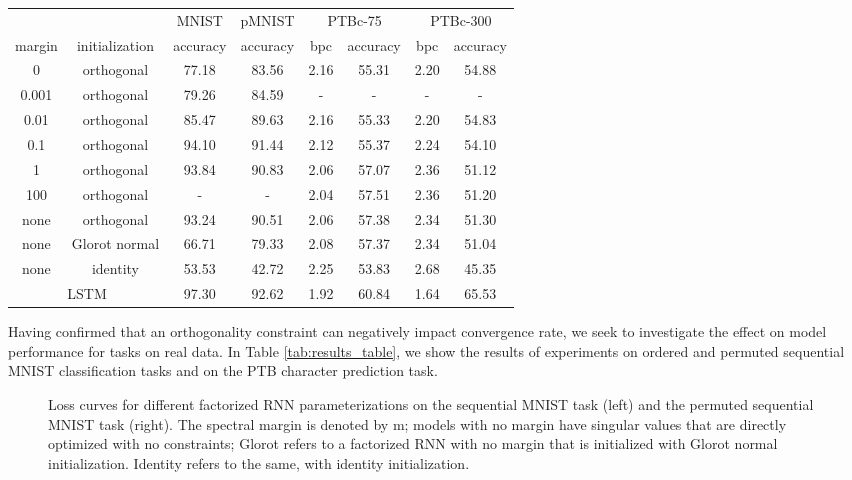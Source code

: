 \documentclass{article} %
\begin{document}
\begin{table*}
\centering
\setlength\tabcolsep{4pt}
\begin{tabular}{ cccccccc }
  & & MNIST & pMNIST & \multicolumn{2}{c}{PTBc-75} & \multicolumn{2}{c}{PTBc-300} \\
  margin & initialization & accuracy & accuracy & bpc & accuracy & bpc & accuracy \\
  \hline
  0   & orthogonal & 77.18 & 83.56 & 2.16 & 55.31 & 2.20 & 54.88 \\
  0.001 & orthogonal & 79.26 & 84.59 & - & - & - & - \\
  0.01 & orthogonal & 85.47 & 89.63 & 2.16 & 55.33 & 2.20 & 54.83 \\
  0.1 & orthogonal & 94.10 & 91.44 & 2.12 & 55.37 & 2.24 & 54.10 \\
  1 & orthogonal & 93.84 & 90.83 & 2.06 & 57.07 & 2.36 & 51.12 \\
  100 & orthogonal & - & - & 2.04 & 57.51 & 2.36 & 51.20 \\
  none& orthogonal & 93.24 & 90.51 & 2.06 & 57.38 & 2.34 & 51.30 \\
  none& Glorot normal & 66.71 & 79.33 & 2.08 & 57.37 & 2.34 & 51.04 \\
  none& identity & 53.53 & 42.72 & 2.25 & 53.83 & 2.68 & 45.35 \\
  \hline
  \multicolumn{2}{c}{LSTM} & 97.30 & 92.62 & 1.92 & 60.84 & 1.64 & 65.53 \\
\end{tabular}
\caption{Performance on MNIST and PTB for different spectral margins and initializations. Evaluated on classification of sequential MNIST (MNIST) and permuted sequential MNIST (pMNIST); character prediction on PTB sentences of up to 75 characters (PTBc-75) and up to 300 characters (PTBc-300).}
\label{tab:results_table}
\end{table*}

Having confirmed that an orthogonality constraint can negatively impact convergence rate, we seek to investigate the effect on model performance for tasks on real data. In Table \ref{tab:results_table}, we show the results of experiments on ordered and permuted sequential MNIST classification tasks and on the PTB character prediction task.

\begin{figure}[htb!]
\centering
{}
\caption{
Loss curves for different factorized RNN parameterizations on the sequential MNIST task (left) and the permuted sequential MNIST task (right). The spectral margin is denoted by m; models with no margin have singular values that are directly optimized with no constraints; Glorot refers to a factorized RNN with no margin that is initialized with Glorot normal initialization. Identity refers to the same, with identity initialization.
}
\label{fig:mnist}
\end{figure}
\end{document}
